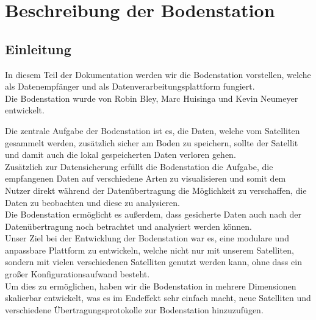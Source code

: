 \section{Beschreibung der Bodenstation}
\subsection{Einleitung}
In diesem Teil der Dokumentation werden wir die Bodenstation vorstellen, welche als Datenempfänger und als Datenverarbeitungsplattform fungiert. \\
Die Bodenstation wurde von Robin Bley, Marc Huisinga und Kevin Neumeyer entwickelt.

Die zentrale Aufgabe der Bodenstation ist es, die Daten, welche vom Satelliten gesammelt werden, zusätzlich sicher am Boden zu speichern, sollte der Satellit und damit auch die lokal gespeicherten Daten verloren gehen. \\
Zusätzlich zur Datensicherung erfüllt die Bodenstation die Aufgabe, die empfangenen Daten auf verschiedene Arten zu visualisieren und somit dem Nutzer direkt während der Datenübertragung die Möglichkeit zu verschaffen, die Daten zu beobachten und diese zu analysieren. \\
Die Bodenstation ermöglicht es außerdem, dass gesicherte Daten auch nach der Datenübertragung noch betrachtet und analysiert werden können. \\
Unser Ziel bei der Entwicklung der Bodenstation war es, eine modulare und anpassbare Plattform zu entwickeln, welche nicht nur mit unserem Satelliten, sondern mit vielen verschiedenen Satelliten genutzt werden kann, ohne dass ein großer Konfigurationsaufwand besteht. \\
Um dies zu ermöglichen, haben wir die Bodenstation in mehrere Dimensionen skalierbar entwickelt, was es im Endeffekt sehr einfach macht, neue Satelliten und verschiedene Übertragungsprotokolle zur Bodenstation hinzuzufügen.

